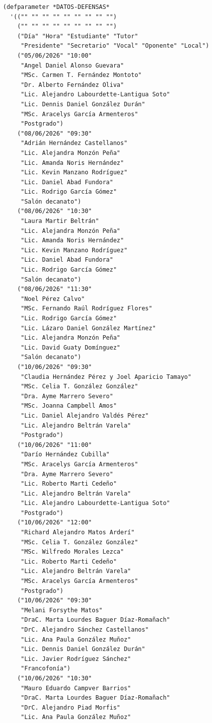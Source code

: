 \documentclass[12pt,a4paper]{report}
\begin{document}
\begin{lstlisting}[caption={data-tutorial.lisp --- datos de entrada.}]
(defparameter *DATOS-DEFENSAS*
  '(("" "" "" "" "" "" "" "" "")
    ("" "" "" "" "" "" "" "" "")
    ("Día" "Hora" "Estudiante" "Tutor"
     "Presidente" "Secretario" "Vocal" "Oponente" "Local")
    ("05/06/2026" "10:00"
     "Angel Daniel Alonso Guevara"
     "MSc. Carmen T. Fernández Montoto"
     "Dr. Alberto Fernández Oliva"
     "Lic. Alejandro Labourdette-Lantigua Soto"
     "Lic. Dennis Daniel González Durán"
     "MSc. Aracelys García Armenteros"
     "Postgrado")
    ("08/06/2026" "09:30"
     "Adrián Hernández Castellanos"
     "Lic. Alejandra Monzón Peña"
     "Lic. Amanda Noris Hernández"
     "Lic. Kevin Manzano Rodríguez"
     "Lic. Daniel Abad Fundora"
     "Lic. Rodrigo García Gómez"
     "Salón decanato")
    ("08/06/2026" "10:30"
     "Laura Martir Beltrán"
     "Lic. Alejandra Monzón Peña"
     "Lic. Amanda Noris Hernández"
     "Lic. Kevin Manzano Rodríguez"
     "Lic. Daniel Abad Fundora"
     "Lic. Rodrigo García Gómez"
     "Salón decanato")
    ("08/06/2026" "11:30"
     "Noel Pérez Calvo"
     "MSc. Fernando Raúl Rodríguez Flores"
     "Lic. Rodrigo García Gómez"
     "Lic. Lázaro Daniel González Martínez"
     "Lic. Alejandra Monzón Peña"
     "Lic. David Guaty Domínguez"
     "Salón decanato")
    ("10/06/2026" "09:30"
     "Claudia Hernández Pérez y Joel Aparicio Tamayo"
     "MSc. Celia T. González González"
     "Dra. Ayme Marrero Severo"
     "MSc. Joanna Campbell Amos"
     "Lic. Daniel Alejandro Valdés Pérez"
     "Lic. Alejandro Beltrán Varela"
     "Postgrado")
    ("10/06/2026" "11:00"
     "Darío Hernández Cubilla"
     "MSc. Aracelys García Armenteros"
     "Dra. Ayme Marrero Severo"
     "Lic. Roberto Marti Cedeño"
     "Lic. Alejandro Beltrán Varela"
     "Lic. Alejandro Labourdette-Lantigua Soto"
     "Postgrado")
    ("10/06/2026" "12:00"
     "Richard Alejandro Matos Arderí"
     "MSc. Celia T. González González"
     "MSc. Wilfredo Morales Lezca"
     "Lic. Roberto Marti Cedeño"
     "Lic. Alejandro Beltrán Varela"
     "MSc. Aracelys García Armenteros"
     "Postgrado")
    ("10/06/2026" "09:30"
     "Melani Forsythe Matos"
     "DraC. Marta Lourdes Baguer Díaz-Romañach"
     "DrC. Alejandro Sánchez Castellanos"
     "Lic. Ana Paula González Muñoz"
     "Lic. Dennis Daniel González Durán"
     "Lic. Javier Rodríguez Sánchez"
     "Francofonía")
    ("10/06/2026" "10:30"
     "Mauro Eduardo Campver Barrios"
     "DraC. Marta Lourdes Baguer Díaz-Romañach"
     "DrC. Alejandro Piad Morfis"
     "Lic. Ana Paula González Muñoz"

\end{lstlisting}
\end{document}
